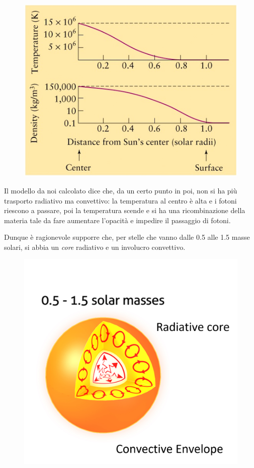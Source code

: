 \begin{figure}[H]
    \centering
    \includegraphics[scale=0.6]{tempdens.png}
\end{figure}

Il modello da noi calcolato dice che, da un certo punto in poi, non si ha più trasporto radiativo ma convettivo: la temperatura al centro è alta e i fotoni riescono a passare, poi la temperatura scende e si ha una ricombinazione della materia tale da fare aumentare l'opacità e impedire il passaggio di fotoni.

Dunque è ragionevole supporre che, per stelle che vanno dalle 0.5 alle 1.5 masse solari, si abbia un \textit{core} radiativo e un involucro convettivo.

\begin{figure}[H]
    \centering
    \includegraphics[scale=0.5]{solecore.png}
\end{figure}

